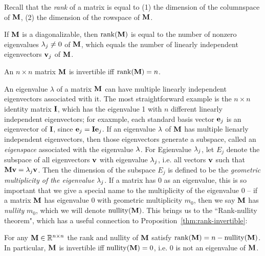 Recall that the \emph{rank} of a matrix is equal to (1) the dimension of the columnspace of $\textbf{M}$, (2) the dimension of the rowspace of $\textbf{M}$.
\begin{proposition}
  If $\textbf{M}$ is a diagonalizable, then $\operatorname{rank}(\textbf{M})$ is equal to the number of nonzero eigenvalues $\lambda_j \neq 0$ of $\textbf{M}$, which equals the number of linearly independent eigenvectors $\textbf{v}_j$ of $\textbf{M}$.
\end{proposition}

\begin{proposition}\label{thm:rank-invertible}
  An $n\times n$ matrix $\textbf{M}$ is invertible iff $\operatorname{rank}(\textbf{M}) = n$.
\end{proposition}

An eigenvalue $\lambda$ of a matrix $\textbf{M}$ can have multiple linearly independent eigenvectors associated with it. The most straightforward example is the $n \times n$ identity matrix $\textbf{I}$, which has the eigenvalue 1 with $n$ different linearly independent eigenvectors; for exaxmple, each standard basis vector $\textbf{e}_j$ is an eigenvector of $\textbf{I}$, since $\textbf{e}_j = \textbf{I}\textbf{e}_j$.
If an eigenvalue $\lambda$ of $\textbf{M}$ has multiple lienarly independent eigenvectors, then those eigenvectors generate a subspace, called an \emph{eigenspace} associated with the eigenvalue $\lambda$. For Egienvalue $\lambda_j$, let $E_j$ denote the subspace of all eigenvectors $\textbf{v}$ with eigenvalue $\lambda_j$, i.e. all vectors $\textbf{v}$ such that $\textbf{M}\textbf{v} = \lambda_j \textbf{v}$. Then the dimension of the subspace $E_j$ is defined to be the \emph{geometric multiplicity of the eigenvalue} $\lambda_j$. If a matrix has 0 as an eigenvalue, this is so important that we give a special name to the multiplicity of the eigenvalue 0 -- if a matrix $\textbf{M}$ has eigenvalue 0 with geometric multiplicity $m_0$, then we say $\textbf{M}$ has \emph{nullity} $m_0$, which we will denote $\operatorname{nullity}(\textbf{M})$.
This brings us to the ``Rank-nullity theorem", which has a useful connection to Proposition~\ref{thm:rank-invertible}:
\begin{theorem}
  For any $\textbf{M} \in \mathbb{R}^{n \times n}$ the rank and nullity of $\textbf{M}$ satisfy $\operatorname{rank}(\textbf{M}) = n - \operatorname{nullity}(\textbf{M})$. In particular, $\textbf{M}$ is invertible iff $\operatorname{nullity}(\textbf{M}) = 0$, i.e. 0 is not an eigenvalue of $\textbf{M}$.
\end{theorem}

